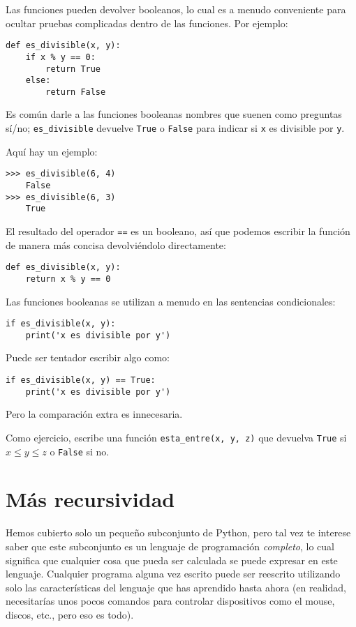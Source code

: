 \documentclass[10pt]{book}
\begin{document}
Las funciones pueden devolver booleanos, lo cual es a menudo conveniente para ocultar
pruebas complicadas dentro de las funciones.  
Por ejemplo:

\begin{verbatim}
def es_divisible(x, y):
    if x % y == 0:
        return True
    else:
        return False
\end{verbatim}
%
Es común darle a las funciones booleanas nombres que suenen como preguntas
sí/no; \verb"es_divisible" devuelve {\tt True} o {\tt False}
para indicar si {\tt x} es divisible por {\tt y}.

Aquí hay un ejemplo:

\begin{verbatim}
>>> es_divisible(6, 4)
    False
>>> es_divisible(6, 3)
    True
\end{verbatim}
%
El resultado del operador {\tt ==} es un booleano, así que podemos escribir la
función de manera más concisa devolviéndolo directamente:

\begin{verbatim}
def es_divisible(x, y):
    return x % y == 0
\end{verbatim}
%
Las funciones booleanas se utilizan a menudo en las sentencias condicionales:

\begin{verbatim}
if es_divisible(x, y):
    print('x es divisible por y')
\end{verbatim}
%
Puede ser tentador escribir algo como:

\begin{verbatim}
if es_divisible(x, y) == True:
    print('x es divisible por y')
\end{verbatim}
%
Pero la comparación extra es innecesaria.

Como ejercicio, escribe una función \verb"esta_entre(x, y, z)" que
devuelva {\tt True} si $x \le y \le z$ o {\tt False} si no.


\section{Más recursividad}
\label{more.recursion}

Hemos cubierto solo un pequeño subconjunto de Python, pero tal vez
te interese saber que este subconjunto es un lenguaje de programación {\em completo},
lo cual significa que cualquier cosa que pueda ser
calculada se puede expresar en este lenguaje.  Cualquier programa alguna vez escrito
puede ser reescrito utilizando solo las características del lenguaje que has aprendido
hasta ahora (en realidad, necesitarías unos pocos comandos para controlar dispositivos
como el mouse, discos, etc., pero eso es todo).
\end{document}

